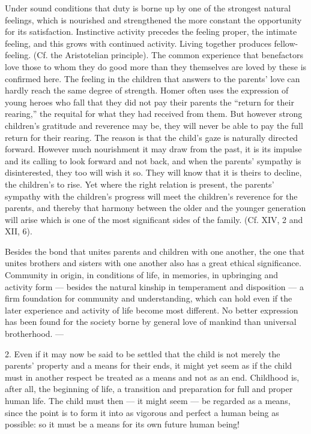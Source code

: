 \documentclass[12pt,a4paper,openany]{book}
\newcommand{\opage}[1]{\marginnote{\footnotesize\textit{[#1]}}}
\begin{document}
Under sound conditions that duty is borne up by one of the strongest natural feelings, which is nourished and
strengthened the more constant the opportunity for its satisfaction. Instinctive activity precedes the feeling proper,
the intimate feeling, and
\opage{330}this grows with continued activity. Living together produces fellow-feeling. (Cf. the Aristotelian
principle). The common experience that benefactors love those to whom they do good more than they themselves are loved
by these is confirmed here. The feeling in the children that answers to the parents' love can hardly reach the same
degree of strength. Homer often uses the expression of young heroes who fall that they did not pay their parents the
``return for their rearing,'' the requital for what they had received from them. But however strong children's gratitude
and reverence may be, they will never be able to pay the full return for their rearing. The reason is that the child's
gaze is naturally directed forward. However much nourishment it may draw from the past, it is its impulse and its calling
to look forward and not back, and when the parents' sympathy is disinterested, they too will wish it so. They will know
that it is theirs to decline, the children's to rise.%
Yet where the right relation is present, the parents' sympathy with the children's progress will meet the children's
reverence for the parents, and thereby that harmony between the older and the younger generation will arise which is one
of the most significant sides of the family. (Cf. XIV, 2 and XII, 6).

Besides the bond that unites parents and children with one another, the one that unites brothers and sisters with one
another also has a great ethical significance. Community in origin, in conditions of life, in memories, in upbringing
and activity form --- besides the natural kinship in temperament and disposition --- a firm foundation for community and
understanding, which can hold even if the later experience and activity of life become most different. No better
expression has been found for the society borne by general love of mankind than universal brotherhood. ---

2. Even if it may now be said to be settled that the child is not merely the parents' property and a means for their
ends, it might yet seem as if the child must in another respect be treated as a means and not as an end. Childhood is,
after all, the beginning of life, a transition and preparation for full and proper human life. The child must then ---
it might seem --- be regarded as a means, since the point is to
\opage{331}form it into as vigorous and perfect a human being as possible: so it must be a means for its own future
human being!
\end{document}
